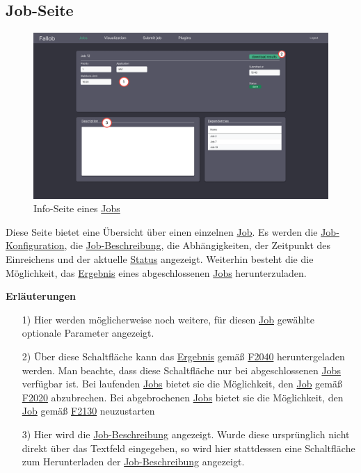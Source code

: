 \subsection{Job-Seite}
\label{pages:job-page}
\begin{figure}[H]
    \centering
    \includegraphics[width=\textwidth]{images-interface/v5_interface/job_info_page_5.pdf}
    \caption{Info-Seite eines \hyperref[B:Jobs]{Jobs}}
    \label{fig:job-page}
\end{figure}
Diese Seite bietet eine Übersicht über einen einzelnen \hyperref[B:Jobs]{Job}. Es werden die \hyperref[B:Job-Konfiguration]{Job-Konfiguration}, die \hyperref[B:Job-Beschreibung]{Job-Beschreibung}, die Abhängigkeiten, der Zeitpunkt des Einreichens und der aktuelle \hyperref[B:Job-Status]{Status} angezeigt. Weiterhin besteht die die Möglichkeit, das \hyperref[B:Job-Ergebnis]{Ergebnis} eines abgeschlossenen \hyperref[B:Jobs]{Jobs} herunterzuladen.

\textbf{Erläuterungen}
\begin{itemize}
    \item[1)] Hier werden möglicherweise noch weitere, für diesen \hyperref[B:Jobs]{Job} gewählte optionale Parameter angezeigt.
    \item[2)] Über diese Schaltfläche kann das \hyperref[B:Job-Ergebnis]{Ergebnis} gemäß \hyperref[FA:Web-Interface:Herunterladen eines einzelnen Ergebnisses]{F2040} heruntergeladen werden. Man beachte, dass diese Schaltfläche nur bei abgeschlossenen \hyperref[B:Jobs]{Jobs} verfügbar ist. Bei laufenden \hyperref[B:Jobs]{Jobs} bietet sie die Möglichkeit, den \hyperref[B:Jobs]{Job} gemäß \hyperref[FA:Web-Interface:Abbruch eines einzelnen Jobs]{F2020} abzubrechen. Bei abgebrochenen \hyperref[B:Jobs]{Jobs} bietet sie die Möglichkeit, den \hyperref[B:Jobs]{Job} gemäß \hyperref[FA:Web-Interface:Neustart]{F2130} neuzustarten
    \item[3)] Hier wird die \hyperref[B:Job-Beschreibung]{Job-Beschreibung} angezeigt. Wurde diese ursprünglich nicht direkt über das Textfeld eingegeben, so wird hier stattdessen eine Schaltfläche zum Herunterladen der \hyperref[B:Job-Beschreibung]{Job-Beschreibung} angezeigt.
\end{itemize}

